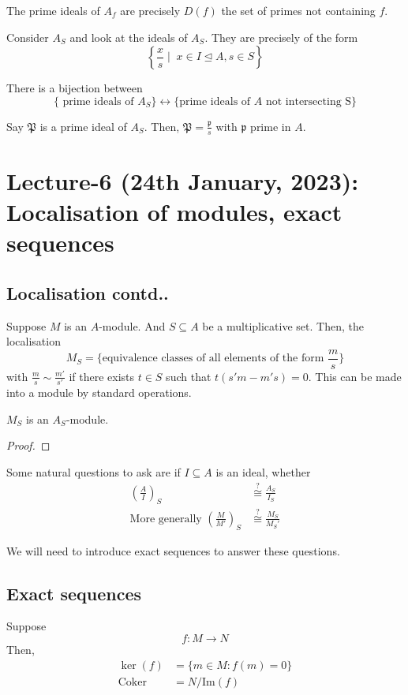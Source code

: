 \documentclass[oneside, 12pt]{scrbook}
\newcommand{\pr}{\mathfrak{p}}
\newcommand{\iM}{\mathrm{Im}}
\newcommand{\coker}{\mathrm{Coker}}
\theoremstyle{theorem}
\begin{document}
\begin{theorem}
The prime ideals of $A_{f}$ are precisely $D(f)$ the set of primes not containing $f$.
\end{theorem}

Consider $A_{S}$ and look at the ideals of $A_{S}$. They are precisely of the form $$\left \{ \frac{x}{s} \mid \;  x \in I \unlhd A, s  \in S \right\}$$

There is a bijection between $$\{ \text{ prime ideals of } A_{S} \} \leftrightarrow \{ \text{prime ideals of } A \text{ not intersecting S} \}$$

Say $\mathfrak{P}$ is a prime ideal of $A_{S}$. Then, $\mathfrak{P} = \frac{\pr}{s}$ with $\pr$ prime in $A$.


\chapter{Lecture-6 (24th January, 2023): Localisation of modules, exact sequences}

\section{Localisation contd..}

Suppose $M$ is an $A$-module. And $S\subseteq A$ be a multiplicative set. Then, the localisation $$M_{S} = \{\text{equivalence classes of all elements of the form } \frac{m}{s}\}$$ with $\frac{m}{s} \sim \frac{m'}{s'}$ if there exists $t\in S$ such that $t(s'm - m's)=0$. This can be made into a module by standard operations. 

\begin{lemma}
$M_{S}$ is an $A_{S}$-module.
\end{lemma}

\begin{proof}

\end{proof}

Some natural questions to ask are if $I \subseteq A$ is an ideal, whether 
\begin{align*}
\left( \frac{A}{I} \right)_{S} &\overset{?}{\cong} \frac{A_{S}}{I_{S}} \\
\text{More generally } \left( \frac{M}{M'} \right)_{S} &\overset{?}{\cong} \frac{M_{S}}{M_{S}'}
\end{align*}


We will need to introduce exact sequences to answer these questions.

\section{Exact sequences}
Suppose $$f: M \rightarrow N$$ Then, 
\begin{align*}
\ker(f) &= \{m \in M : f(m)=0\} \\
\coker &= N/\iM(f)
\end{align*}
\end{document}
